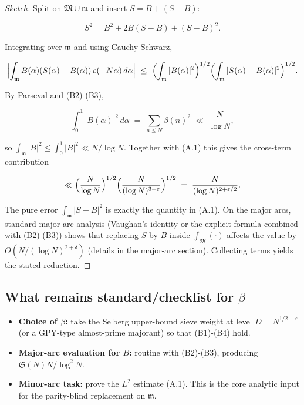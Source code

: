 \documentclass[11pt]{article}
\theoremstyle{definition}
\theoremstyle{remark}
\begin{document}
\begin{proof}[Sketch]
	Split on $\mathfrak M\cup\mathfrak m$ and insert $S=B+(S-B)$:

	$$
		S^2 = B^2 + 2B(S-B) + (S-B)^2.
	$$

	Integrating over $\mathfrak m$ and using Cauchy-Schwarz,

	$$
		\Bigl|\int_{\mathfrak m} B(\alpha)(S(\alpha)-B(\alpha))\,e(-N\alpha)\,d\alpha\Bigr|
		\ \le\ \Bigl(\int_{\mathfrak m}|B(\alpha)|^2\Bigr)^{1/2}
		\Bigl(\int_{\mathfrak m}|S(\alpha)-B(\alpha)|^2\Bigr)^{1/2}.
	$$

	By Parseval and (B2)-(B3),

	$$
		\int_0^1 |B(\alpha)|^2\,d\alpha \;=\; \sum_{n\le N}\beta(n)^2 \;\ll\; \frac{N}{\log N},
	$$

	so $\int_{\mathfrak m}|B|^2\le\int_0^1|B|^2\ll N/\log N$. Together with (A.1) this gives the cross-term contribution

	$$
		\ll \Bigl(\frac{N}{\log N}\Bigr)^{1/2}\Bigl(\frac{N}{(\log N)^{3+\varepsilon}}\Bigr)^{1/2}
		\;=\;\frac{N}{(\log N)^{2+\varepsilon/2}}.
	$$

	The pure error $\int_{\mathfrak m}|S-B|^2$ is exactly the quantity in (A.1). On the major arcs, standard major-arc analysis (Vaughan’s identity or the explicit formula combined with (B2)-(B3)) shows that replacing $S$ by $B$ inside $\int_{\mathfrak M}(\cdot)$ affects the value by $O(N/(\log N)^{2+\delta})$ (details in the major-arc section). Collecting terms yields the stated reduction.
\end{proof}

\subsection*{What remains standard/checklist for $\beta$}

\begin{itemize}
	\item \textbf{Choice of $\beta$:} take the Selberg upper-bound sieve weight at level $D=N^{1/2-\varepsilon}$ (or a GPY-type almost-prime majorant) so that (B1)-(B4) hold.
	\item \textbf{Major-arc evaluation for $B$:} routine with (B2)-(B3), producing $\mathfrak S(N)N/\log^2 N$.
	\item \textbf{Minor-arc task:} prove the $L^2$ estimate (A.1). This is the core analytic input for the parity-blind replacement on $\mathfrak m$.
\end{itemize}
\end{document}
